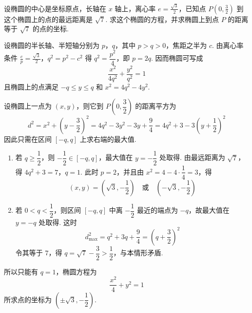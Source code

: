 \documentclass[UTF8,a4paper,oneside,11pt]{ctexbook}
\begin{document}
\begin{problem}
设椭圆的中心是坐标原点，长轴在 \(x\) 轴上，离心率 \(e=\frac{\sqrt{3}}{2}\)，已知点 \(P\left( 0,\frac{3}{2} \right)\) 到这个椭圆上的点的最远距离是 \(\sqrt{7}\). 求这个椭圆的方程，并求椭圆上到点 \(P\) 的距离等于 \(\sqrt{7}\) 的点的坐标.
\end{problem}

\begin{solution}
设椭圆的半长轴、半短轴分别为 \(p\)，\(q\)，其中 \(p>q>0\)，焦距之半为 \(c\). 由离心率条件
\(\frac{c}{p}=\frac{\sqrt{3}}{2}\)，\(q^2=p^2-c^2\)
得 \(q^2=\dfrac{p^2}{4}\)，即 \(p=2q\). 因而椭圆可写成
\[
\frac{x^2}{4q^2}+\frac{y^2}{q^2}=1
\]
且椭圆上的点满足 \(-q\leqslant y\leqslant q\) 和 \(x^2=4q^2-4y^2\).

设椭圆上一点为 \((x,y)\)，则它到 \(P\left(0,\dfrac{3}{2}\right)\) 的距离平方为
\[
d^2=x^2+\left(y-\frac{3}{2}\right)^2
=4q^2-3y^2-3y+\frac{9}{4}
=4q^2+3-3\left(y+\frac{1}{2}\right)^2
\]
因此只需在区间 \([-q,q]\) 上求右端的最大值.
\begin{enumerate}
\item 若 \(q\geqslant\dfrac{1}{2}\)，则 \(-\dfrac{1}{2}\in[-q,q]\)，最大值在 \(y=-\dfrac{1}{2}\) 处取得. 由最远距离为 \(\sqrt{7}\)，得
\(4q^2+3=7\)，\(q=1\).
此时 \(p=2\)，并且由 \(x^2=4-4\cdot\dfrac{1}{4}=3\)，得
\[
(x,y)=\left(\sqrt{3},-\frac{1}{2}\right)\quad\text{或}\quad\left(-\sqrt{3},-\frac{1}{2}\right)
\]

\item 若 \(0<q<\dfrac{1}{2}\)，则区间 \([-q,q]\) 中离 \(-\dfrac{1}{2}\) 最近的端点为 \(-q\)，故最大值在 \(y=-q\) 处取得. 这时
\[
d_{\max}^2=q^2+3q+\frac{9}{4}=\left(q+\frac{3}{2}\right)^2
\]
令其等于 \(7\)，得 \(q=\sqrt{7}-\dfrac{3}{2}>\dfrac{1}{2}\)，与本情形矛盾.
\end{enumerate}
所以只能有 \(q=1\)，椭圆方程为
\[
\frac{x^2}{4}+y^2=1
\]
所求点的坐标为 \(\left(\pm\sqrt{3},-\dfrac{1}{2}\right)\).
\end{solution}

\end{document}
